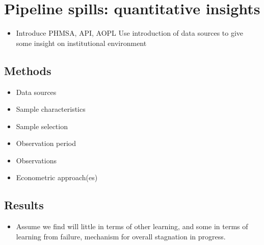 	\section{Pipeline spills: quantitative insights}
	\begin{paracol}{2}
	\begin{itemize}
		\item Introduce PHMSA, API, AOPL
		\switchcolumn Use introduction of data sources to give some insight on institutional environment
		\switchcolumn* 
	\end{itemize}
	\end{paracol}

	\subsection{Methods}
	\begin{paracol}{2}
	\begin{itemize}
		\item Data sources
		\item Sample characteristics
			\item Sample selection
			\item Observation period
			\item Observations
		\item Econometric approach(es)
	\end{itemize}
	\end{paracol}

	\subsection{Results}
	\begin{paracol}{2}
	\begin{itemize}
		\item Assume we find will little in terms of other learning, and some in terms of learning from failure, mechanism for overall stagnation in progress.
	\end{itemize}
	\end{paracol}